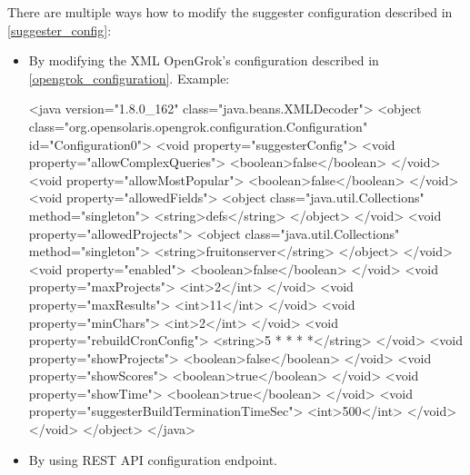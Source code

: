 There are multiple ways how to modify the suggester configuration described in \ref{suggester_config}:
\begin{itemize}
    \item By modifying the XML OpenGrok's configuration described in \ref{opengrok_configuration}. Example:
\begin{code}
<java version="1.8.0_162" class="java.beans.XMLDecoder">
  <object
      class="org.opensolaris.opengrok.configuration.Configuration"
      id="Configuration0">
    <void property="suggesterConfig">
      <void property="allowComplexQueries">
        <boolean>false</boolean>
      </void>
      <void property="allowMostPopular">
        <boolean>false</boolean>
      </void>
      <void property="allowedFields">
        <object class="java.util.Collections" method="singleton">
          <string>defs</string>
        </object>
      </void>
      <void property="allowedProjects">
        <object class="java.util.Collections" method="singleton">
          <string>fruitonserver</string>
        </object>
      </void>
      <void property="enabled">
        <boolean>false</boolean>
      </void>
      <void property="maxProjects">
        <int>2</int>
      </void>
      <void property="maxResults">
        <int>11</int>
      </void>
      <void property="minChars">
        <int>2</int>
      </void>
      <void property="rebuildCronConfig">
        <string>5 * * * *</string>
      </void>
      <void property="showProjects">
        <boolean>false</boolean>
      </void>
      <void property="showScores">
        <boolean>true</boolean>
      </void>
      <void property="showTime">
        <boolean>true</boolean>
      </void>
      <void property="suggesterBuildTerminationTimeSec">
        <int>500</int>
      </void>
    </void>
  </object>
</java>
\end{code}
    \item By using REST API configuration endpoint.
\end{itemize}
